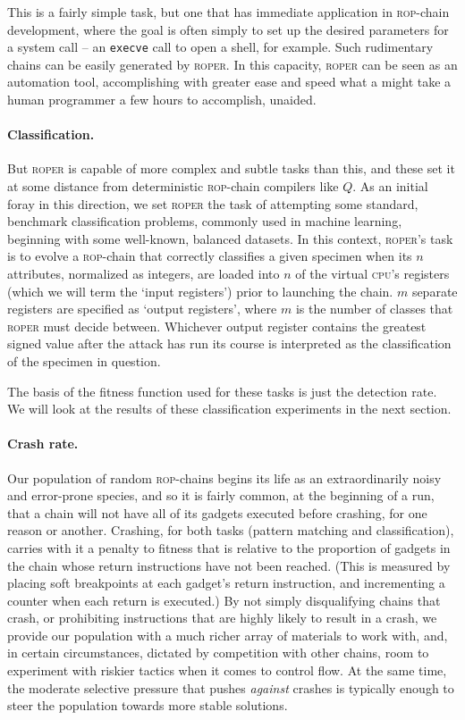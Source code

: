 This is a fairly simple task, but one that has immediate
application in \textsc{rop}-chain development, where the goal is
often simply to set up the desired parameters for a system call
-- an \texttt{execve} call to open a shell, for example. Such
rudimentary chains can be easily generated by \textsc{roper}. 
In this capacity, \textsc{roper} can be seen as an automation
tool, accomplishing with greater ease and speed what a might take
a human programmer a few hours to accomplish, unaided. 

\paragraph{Classification.} But \textsc{roper} is capable of
more complex and subtle tasks than this, and these set it at some
distance from deterministic \textsc{rop}-chain compilers like
$Q$. As an initial foray in this direction, we set \textsc{roper}
the task of attempting some standard, benchmark classification
problems, commonly used in machine learning, beginning with some
well-known, balanced datasets. In this context, \textsc{roper}'s
task is to evolve a \textsc{rop}-chain that correctly classifies
a given specimen when its $n$ attributes, normalized as integers,
are loaded into $n$ of the virtual \textsc{cpu}'s registers
(which we will term the `input registers') prior to launching the
chain. $m$ separate registers are specified as `output
registers', where $m$ is the number of classes that
\textsc{roper} must decide between. Whichever output register
contains the greatest signed value after the attack has run its
course is interpreted as the classification of the specimen in
question. 

The basis of the fitness function used for these tasks
is just the detection rate. %
We will look at the results of these classification experiments
in the next section. 

\paragraph{Crash rate.} Our population of random
\textsc{rop}-chains begins its life as an extraordinarily noisy
and error-prone species, and so it is fairly common, at the
beginning of a run, that a chain will not have all of its gadgets
executed before crashing, for one reason or another. Crashing,
for both tasks (pattern matching and classification),
carries with it a penalty to fitness that is relative to the
proportion of gadgets in the chain whose return instructions have
not been reached. (This is measured by placing soft breakpoints at
each gadget's return instruction, and incrementing a counter when
each return is executed.) By not simply disqualifying chains that
crash, or prohibiting instructions that are highly likely to
result in a crash, we provide our population with a much richer
array of materials to work with, and, in certain circumstances,
dictated by competition with other chains, room to experiment
with riskier tactics when it comes to control flow. At the same
time, the moderate selective pressure that pushes \emph{against}
crashes is typically enough to steer the population towards
more stable solutions. 

